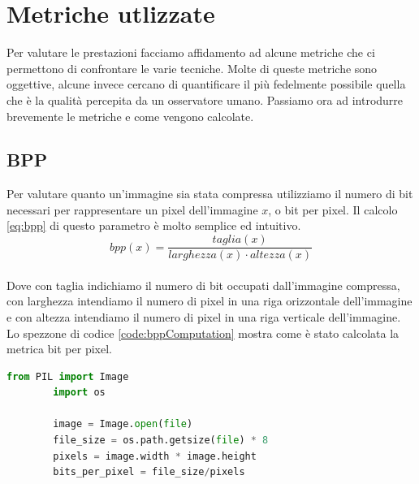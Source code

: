 \section{Metriche utlizzate}
Per valutare le prestazioni facciamo affidamento ad alcune metriche che ci permettono di confrontare le varie tecniche. Molte di queste metriche sono oggettive, alcune invece cercano di quantificare il più fedelmente possibile quella che è la qualità percepita da un osservatore umano.
Passiamo ora ad introdurre brevemente le metriche e come vengono calcolate.\\

\subsection{BPP}
Per valutare quanto un’immagine sia stata compressa utilizziamo il numero di bit necessari per rappresentare un pixel dell’immagine $x$, o bit per pixel. Il calcolo \ref{eq:bpp} di questo parametro è molto semplice ed intuitivo.\\
\begin{equation}\label{eq:bpp}
    bpp(x) = \dfrac{taglia (x)}{larghezza (x) \cdot altezza (x)}
\end{equation}\\
Dove con taglia indichiamo il numero di bit occupati dall’immagine compressa, con larghezza intendiamo il numero di pixel in una riga orizzontale dell’immagine e con altezza intendiamo il numero di pixel in una riga verticale dell’immagine.\\
Lo spezzone di codice \ref{code:bppComputation} mostra come è stato calcolata la metrica bit per pixel.\\
\begin{adjustbox}{max width=\textwidth}
    \begin{lstlisting}[language=Python, caption=Spezzone di codice per il calcolo dei bit per pixel, label=code:bppComputation]
        from PIL import Image
        import os
        
        image = Image.open(file)
        file_size = os.path.getsize(file) * 8
        pixels = image.width * image.height
        bits_per_pixel = file_size/pixels
    \end{lstlisting}
\end{adjustbox}

